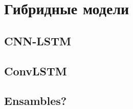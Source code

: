 \section{\color{red}Гибридные модели}

\subsection{\color{red}CNN-LSTM}

\subsection{\color{red}ConvLSTM}

\subsection{\color{red}Ensambles?}
